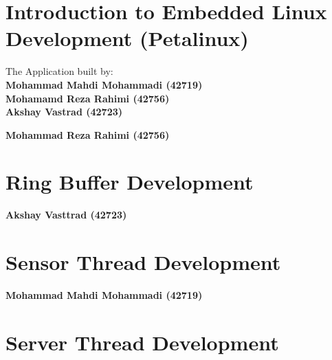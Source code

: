 \documentclass[11pt, a4paper]{report}
\begin{document}
\chapter{Introduction to Embedded Linux Development (Petalinux)}







\newpage
\null 
\vfill
\begin{center}
The Application built by:\\ 
\textbf{\large Mohammad Mahdi Mohammadi (42719)\\
Mohamamd Reza Rahimi (42756)\\ 
Akshay Vastrad (42723)}
\end{center}
\vfill
\thispagestyle{empty}
\clearpage


\newpage
\null 
\vfill
\begin{center}
	\textbf{\large Mohammad Reza Rahimi (42756) } \\ 
\end{center}
\vfill
{}
\newpage

\chapter{Ring Buffer Development}



\newpage
\null 
\vfill
\begin{center}
\textbf{\large Akshay Vasttrad (42723)}
\end{center}
\vfill
{}
\clearpage

\chapter{Sensor Thread Development}



\newpage
\null 
\vfill
\begin{center}
	\textbf{\large Mohammad Mahdi Mohammadi (42719)} \\ 
\end{center}
\vfill
{}
\newpage

\chapter{Server Thread Development}

\end{document}
